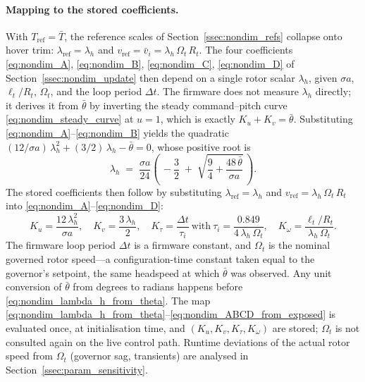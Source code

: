 \documentclass[11pt,a4paper]{article}
\newcommand{\OmegaT}{\Omega_t}
\newcommand{\Rt}{R_t}
\newcommand{\bvi}{\bar{v}_i}
\newcommand{\bT}{\bar{T}}
\newcommand{\btheta}{\bar{\theta}}
\begin{document}
\paragraph{Mapping to the stored coefficients.}
With \(T_{\text{ref}}=\bT\), the reference scales of
Section~\ref{ssec:nondim_refs} collapse onto hover trim:
\(\lambda_{\text{ref}}=\lambda_h\) and
\(v_{\text{ref}}=\bvi=\lambda_h\,\OmegaT\,\Rt\). The four coefficients
\eqref{eq:nondim_A}, \eqref{eq:nondim_B}, \eqref{eq:nondim_C},
\eqref{eq:nondim_D} of Section~\ref{ssec:nondim_update} then depend on a
single rotor scalar \(\lambda_h\), given \(\sigma a\), \(\ell_t/\Rt\),
\(\OmegaT\), and the loop period \(\Delta t\). The firmware does not
measure \(\lambda_h\) directly; it derives it from \(\btheta\) by
inverting the steady command--pitch curve \eqref{eq:nondim_steady_curve}
at \(u=1\), which is exactly \(K_u+K_v=\btheta\). Substituting
\eqref{eq:nondim_A}--\eqref{eq:nondim_B} yields the quadratic
\((12/\sigma a)\,\lambda_h^2 + (3/2)\,\lambda_h - \btheta = 0\), whose
positive root is
\begin{equation}
\lambda_h \;=\; \frac{\sigma a}{24}\!
              \left(\,-\frac{3}{2}
              \;+\; \sqrt{\frac{9}{4} + \frac{48\,\btheta}{\sigma a}}\,\right).
\label{eq:nondim_lambda_h_from_theta}
\end{equation}
The stored coefficients then follow by substituting
\(\lambda_{\text{ref}}=\lambda_h\) and
\(v_{\text{ref}}=\lambda_h\,\OmegaT\,\Rt\) into
\eqref{eq:nondim_A}--\eqref{eq:nondim_D}:
\begin{equation}
K_u = \frac{12\,\lambda_h^2}{\sigma a},\quad
K_v = \frac{3\,\lambda_h}{2},\quad
K_\tau = \frac{\Delta t}{\tau_i}\ \text{with}\ \tau_i = \frac{0.849}{4\,\lambda_h\,\OmegaT},\quad
K_\omega = \frac{\ell_t/\Rt}{\lambda_h\,\OmegaT}.
\label{eq:nondim_ABCD_from_exposed}
\end{equation}
The firmware loop period \(\Delta t\) is a firmware constant, and
\(\OmegaT\) is the nominal governed rotor speed---a configuration-time
constant taken equal to the governor's setpoint, the same headspeed
at which \(\btheta\) was observed. Any unit conversion of \(\btheta\)
from degrees to radians happens before
\eqref{eq:nondim_lambda_h_from_theta}. The map
\eqref{eq:nondim_lambda_h_from_theta}--\eqref{eq:nondim_ABCD_from_exposed}
is evaluated once, at initialisation time, and \((K_u,K_v,K_\tau,K_\omega)\) are stored;
\(\OmegaT\) is not consulted again on the live control path. Runtime
deviations of the actual rotor speed from \(\OmegaT\) (governor sag,
transients) are analysed in Section~\ref{ssec:param_sensitivity}.
\end{document}
